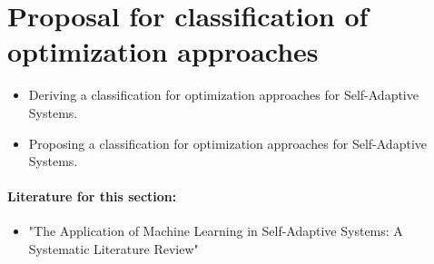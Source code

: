 \newpage
\section{Proposal for classification of optimization approaches}
\label{ch:Proposal}

\begin{itemize}
    \item Deriving a classification for optimization approaches for Self-Adaptive Systems.
    \item Proposing a classification for optimization approaches for Self-Adaptive Systems.
\end{itemize}

\paragraph*{Literature for this section:} \begin{itemize}
    \item "The Application of Machine Learning in Self-Adaptive Systems: A Systematic Literature Review" \cite{9249012}
\end{itemize}